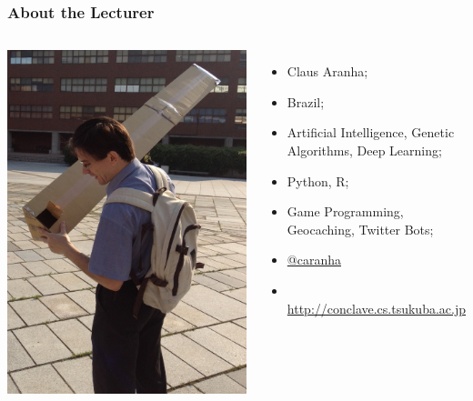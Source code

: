 \documentclass{beamer}
\begin{document}
\begin{frame}
  \frametitle{About the Lecturer}
  \begin{columns}
    \includegraphics[width=1\textwidth]{../img/pinhole}
    {\small
    \begin{itemize}
      \item {} Claus Aranha;
      \item {} Brazil;
        
        \medskip

      \item {} Artificial Intelligence, Genetic
        Algorithms, Deep Learning;
      \item {} Python, R;
      \item {} Game Programming, Geocaching, Twitter
        Bots;
        
        \medskip

      \item {} \href{http://www.twitter.com/caranha}{@caranha}
      \item {}\\ {\smaller \url{http://conclave.cs.tsukuba.ac.jp}}
    \end{itemize}
    }
  \end{columns}
\end{frame}
\end{document}
